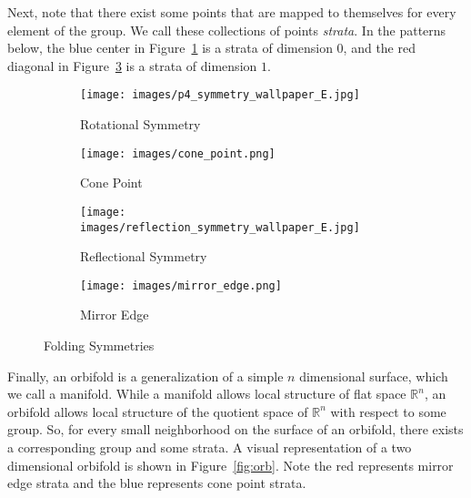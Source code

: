 \documentclass{article}[12pt]
\theoremstyle{definition}
\begin{document}
Next, note that there exist some points that are mapped to themselves for
every element of the group. We call these collections of points
\emph{strata}. In the patterns below, the blue center in
Figure~\ref{fig:rot_sym} is a strata of dimension $0$, and the red diagonal
in Figure~\ref{fig:ref_sym} is a strata of dimension $1$.

 \begin{figure}[h]
     \centering
        \begin{subfigure}{0.25\textwidth}
        \texttt{[image: images/p4\_symmetry\_wallpaper\_E.jpg]}
        \caption{Rotational Symmetry}
        \label{fig:rot_sym}
        \end{subfigure}
        \begin{subfigure}{0.2\textwidth}
            \texttt{[image: images/cone\_point.png]}
            \caption{Cone Point}
            \label{fig:cp}
        \end{subfigure}
        \begin{subfigure}{0.25\textwidth}
        \texttt{[image: images/reflection\_symmetry\_wallpaper\_E.jpg]}
        \caption{Reflectional Symmetry}
        \label{fig:ref_sym}
        \end{subfigure}
        \begin{subfigure}{0.2\textwidth}
            \texttt{[image: images/mirror\_edge.png]}
            \caption{Mirror Edge}
            \label{fig:me}
        \end{subfigure}
        \caption{Folding Symmetries}
        \label{fig:sym}
    \end{figure}


Finally, an orbifold is a generalization of a simple $n$ dimensional surface,
which we call a manifold. While a manifold allows local structure of flat
space $\mathbb{R}^n$, an orbifold allows local structure of the quotient
space of $\mathbb{R}^n$ with respect to some group. So, for every small
neighborhood on the surface of an orbifold, there exists a corresponding
group and some strata. A visual representation of a two dimensional
orbifold is shown in Figure~\ref{fig:orb}. Note the red represents mirror
edge strata and the blue represents cone point strata.
\end{document}
